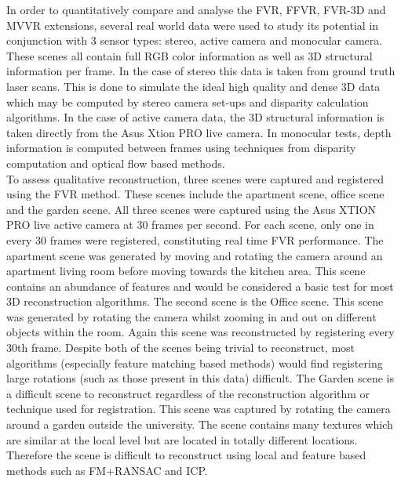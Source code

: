
In order to quantitatively compare and analyse the FVR, FFVR, FVR-3D and MVVR extensions, several real world data were used to study its potential in conjunction with 3 sensor types: stereo, active camera and monocular camera. These scenes all contain full RGB color information as well as 3D structural information per frame. In the case of stereo this data is taken from ground truth laser scans. This is done to simulate the ideal high quality and dense 3D data which may be computed by stereo camera set-ups and disparity calculation algorithms. In the case of active camera data, the 3D structural information is taken directly from the Asus Xtion PRO live camera. In monocular tests, depth information is computed between frames using techniques from disparity computation and optical flow based methods. \\ 

To assess qualitative reconstruction, three scenes were captured and registered using the FVR method. These scenes include the apartment scene, office scene and the garden scene. All three scenes were captured using the Asus XTION PRO live active camera at 30 frames per second. For each scene, only one in every 30 frames were registered, constituting real time FVR performance. The apartment scene was generated by moving and rotating the camera around an apartment living room before moving towards the kitchen area. This scene contains an abundance of features and would be considered a basic test for most 3D reconstruction algorithms. The second scene is the Office scene. This scene was generated by rotating the camera whilst zooming in and out on different objects within the room. Again this scene was reconstructed by registering every 30th frame. Despite both of the scenes being trivial to reconstruct, most algorithms (especially feature matching based methods) would find registering large rotations (such as those present in this data) difficult. The Garden scene is a difficult scene to reconstruct regardless of the reconstruction algorithm or technique used for registration. This scene was captured by rotating the camera around a garden outside the university. The scene contains many textures which are similar at the local level but are located in totally different locations. Therefore the scene is difficult to reconstruct using local and feature based methods such as FM+RANSAC and ICP. \\


 


